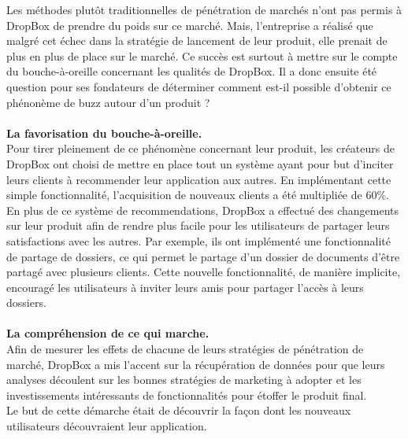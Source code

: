 \documentclass[a4paper, 10pt]{article}
\begin{document}
Les méthodes plutôt traditionnelles de pénétration de marchés n'ont pas permis à DropBox de prendre du poids sur ce marché.
Mais, l'entreprise a réalisé que malgré cet échec dans la stratégie de lancement de leur produit,
elle prenait de plus en plus de place sur le marché.
Ce succès est surtout à mettre sur le compte du bouche-à-oreille concernant les qualités de DropBox.
Il a donc ensuite été question pour ses fondateurs de déterminer comment est-il possible d'obtenir ce phénonème de buzz autour d'un produit ?\\ \\
\textbf{La favorisation du bouche-à-oreille.}\\
Pour tirer pleinement de ce phénomène concernant leur produit, les créateurs de DropBox ont choisi de mettre en place tout un système
ayant pour but d'inciter leurs clients à recommender leur application aux autres.
En implémentant cette simple fonctionnalité, l'acquisition de nouveaux clients a été multipliée de 60\%.\\
En plus de ce système de recommendations, DropBox a effectué des changements sur leur produit afin de rendre plus facile pour les utilisateurs
de partager leurs satisfactions avec les autres.
Par exemple, ils ont implémenté une fonctionnalité de partage de dossiers, ce qui permet le partage d'un dossier de documents d'être partagé
avec plusieurs clients. Cette nouvelle fonctionnalité, de manière implicite, encouragé les utilisateurs à inviter leurs amis pour
partager l'accès à leurs dossiers.\\ \\
\textbf{La compréhension de ce qui marche.}\\
Afin de mesurer les effets de chacune de leurs stratégies de pénétration de marché, DropBox a mis l'accent sur la récupération de données
pour que leurs analyses découlent sur les bonnes stratégies de marketing à adopter et les investissements intéressants
de fonctionnalités pour étoffer le produit final.\\
Le but de cette démarche était de découvrir la façon dont les nouveaux utilisateurs découvraient leur application.

\newpage
\end{document}
